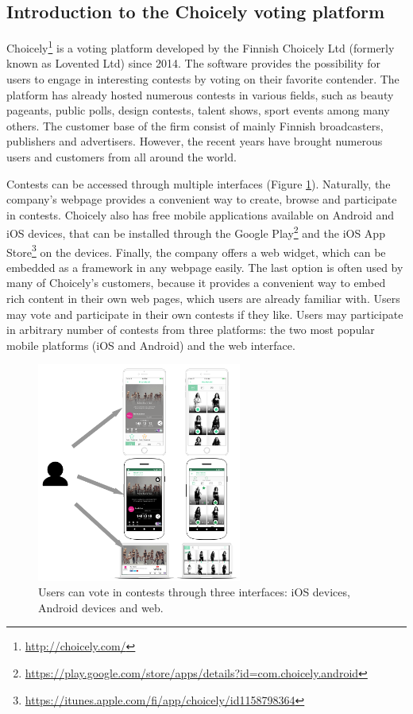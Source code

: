 \subsection{Introduction to the Choicely voting platform}
    Choicely\footnote{\url{http://choicely.com/}} is a voting platform developed by the Finnish Choicely Ltd (formerly known as Lovented Ltd) since 2014. The software provides the possibility for users to engage in interesting contests by voting on their favorite contender. The platform has already hosted numerous contests in various fields, such as beauty pageants, public polls, design contests, talent shows, sport events among many others. The customer base of the firm consist of mainly Finnish broadcasters, publishers and advertisers. However, the recent years have brought numerous users and customers from all around the world.

    Contests can be accessed through multiple interfaces (Figure \ref{choicely_platforms}). Naturally, the company's webpage provides a convenient way to create, browse and participate in contests. Choicely also has free mobile applications available on Android and iOS devices, that can be installed through the Google Play\footnote{\url{https://play.google.com/store/apps/details?id=com.choicely.android}} and the iOS App Store\footnote{\url{https://itunes.apple.com/fi/app/choicely/id1158798364}} on the devices. Finally, the company offers a web widget, which can be embedded as a framework in any webpage easily. The last option is often used by many of Choicely's customers, because it provides a convenient way to embed rich content in their own web pages, which users are already familiar with. Users may vote and participate in their own contests if they like. Users may participate in arbitrary number of contests from three platforms: the two most popular mobile platforms (iOS and Android) and the web interface. 

    \begin{figure}[h] 
        \begin{center}
            \includegraphics[width=0.6\textwidth]{images/choicely_platforms.png}
            \caption{Users can vote in contests through three interfaces: iOS devices, Android devices and web.}
            \label{choicely_platforms}
        \end{center}
    \end{figure}

